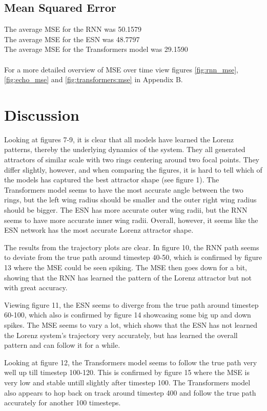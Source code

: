 \documentclass[11pt]{article}
\begin{document}
\subsection{Mean Squared Error}
The average MSE for the RNN was 50.1579 \\
The average MSE for the ESN was 48.7797 \\
The average MSE for the Transformers model was 29.1590 \\ \\
For a more detailed overview of MSE over time view figures \ref{fig:rnn_mse}, \ref{fig:echo_mse} and \ref{fig:transformers:mse} in Appendix B.

\section{Discussion}
Looking at figures 7-9, it is clear that all models have learned the Lorenz patterns, thereby the underlying dynamics of the system. They all generated attractors of similar scale with two rings centering around two focal points. They differ slightly, however, and when comparing the figures, it is hard to tell which of the models has captured the best attractor shape (see figure 1). The Transformers model seems to have the most accurate angle between the two rings, but the left wing radius should be smaller and the outer right wing radius should be bigger. The ESN has more accurate outer wing radii, but the RNN seems to have more accurate inner wing radii. Overall, however, it seems like the ESN network has the most accurate Lorenz attractor shape.

The results from the trajectory plots are clear. In figure 10, the RNN path seems to deviate from the true path around timestep 40-50, which is confirmed by figure 13 where the MSE could be seen spiking. The MSE then goes down for a bit, showing that the RNN has learned the pattern of the Lorenz attractor but not with great accuracy.

Viewing figure 11, the ESN seems to diverge from the true path around timestep 60-100, which also is confirmed by figure 14 showcasing some big up and down spikes. The MSE seems to vary a lot, which shows that the ESN has not learned the Lorenz system's trajectory very accurately, but has learned the overall pattern and can follow it for a while.

Looking at figure 12, the Transformers model seems to follow the true path very well up till timestep 100-120. This is confirmed by figure 15 where the MSE is very low and stable untill slightly after timestep 100. The Transformers model also appears to hop back on track around timestep 400 and follow the true path accurately for another 100 timesteps.
\end{document}
